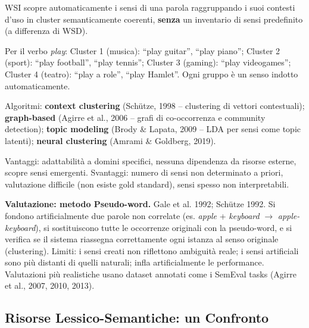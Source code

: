 \documentclass[12pt,a4paper]{article}
\begin{document}
\begin{defbox}
WSI scopre automaticamente i sensi di una parola raggruppando i suoi contesti d'uso in cluster semanticamente coerenti, \textbf{senza} un inventario di sensi predefinito (a differenza di WSD).
\end{defbox}

\begin{examplebox}
Per il verbo \textit{play}: Cluster 1 (musica): ``play guitar'', ``play piano''; Cluster 2 (sport): ``play football'', ``play tennis''; Cluster 3 (gaming): ``play videogames''; Cluster 4 (teatro): ``play a role'', ``play Hamlet''. Ogni gruppo \`e un senso indotto automaticamente.
\end{examplebox}

Algoritmi: \textbf{context clustering} (Sch\"utze, 1998 -- clustering di vettori contestuali); \textbf{graph-based} (Agirre et al., 2006 -- grafi di co-occorrenza e community detection); \textbf{topic modeling} (Brody \& Lapata, 2009 -- LDA per sensi come topic latenti); \textbf{neural clustering} (Amrami \& Goldberg, 2019).

Vantaggi: adattabilit\`a a domini specifici, nessuna dipendenza da risorse esterne, scopre sensi emergenti. Svantaggi: numero di sensi non determinato a priori, valutazione difficile (non esiste gold standard), sensi spesso non interpretabili.

\begin{defbox}
\textbf{Valutazione: metodo Pseudo-word.}
Gale et al. 1992; Sch\"utze 1992. Si fondono artificialmente due parole non correlate (es. \textit{apple} + \textit{keyboard} $\to$ \textit{apple-keyboard}), si sostituiscono tutte le occorrenze originali con la pseudo-word, e si verifica se il sistema riassegna correttamente ogni istanza al senso originale (clustering). Limiti: i sensi creati non riflettono ambiguit\`a reale; i sensi artificiali sono pi\`u distanti di quelli naturali; infla artificialmente le performance. Valutazioni pi\`u realistiche usano dataset annotati come i SemEval tasks (Agirre et al., 2007, 2010, 2013).
\end{defbox}

\subsection{Risorse Lessico-Semantiche: un Confronto}
\end{document}
